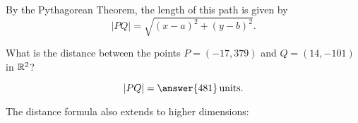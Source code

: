 \documentclass{ximera}
\begin{document}
\begin{theorem}
\begin{explanation}
\begin{image}
    \end{image}
    By the Pythagorean Theorem, the length of this path is given by 
    \[
    |PQ|=\sqrt{(x-a)^{2}+(y-b)^{2}}.
    \]
  \end{explanation}
\end{theorem}

\begin{question}
  What is the distance between the points $P=(-17,379)$ and
  $Q=(14,-101)$ in $\mathbb R^2$?
  \begin{prompt}
    \[
    |PQ|=\answer{481}\unit{units}.
    \]
  \end{prompt}
\end{question}

The distance formula also extends to higher dimensions:
\end{document}
